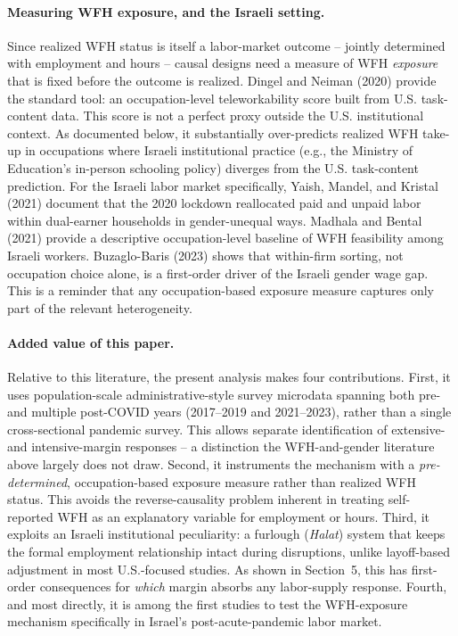 \documentclass[11pt]{article}
\begin{document}
\paragraph{Measuring WFH exposure, and the Israeli setting.} Since realized WFH status is itself a labor-market outcome -- jointly determined with employment and hours -- causal designs need a measure of WFH \emph{exposure} that is fixed before the outcome is realized. Dingel and Neiman (2020) provide the standard tool: an occupation-level teleworkability score built from U.S. task-content data. This score is not a perfect proxy outside the U.S. institutional context. As documented below, it substantially over-predicts realized WFH take-up in occupations where Israeli institutional practice (e.g., the Ministry of Education's in-person schooling policy) diverges from the U.S. task-content prediction. For the Israeli labor market specifically, Yaish, Mandel, and Kristal (2021) document that the 2020 lockdown reallocated paid and unpaid labor within dual-earner households in gender-unequal ways. Madhala and Bental (2021) provide a descriptive occupation-level baseline of WFH feasibility among Israeli workers. Buzaglo-Baris (2023) shows that within-firm sorting, not occupation choice alone, is a first-order driver of the Israeli gender wage gap. This is a reminder that any occupation-based exposure measure captures only part of the relevant heterogeneity.

\paragraph{Added value of this paper.} Relative to this literature, the present analysis makes four contributions. First, it uses population-scale administrative-style survey microdata spanning both pre- and multiple post-COVID years (2017--2019 and 2021--2023), rather than a single cross-sectional pandemic survey. This allows separate identification of extensive- and intensive-margin responses -- a distinction the WFH-and-gender literature above largely does not draw. Second, it instruments the mechanism with a \emph{pre-determined}, occupation-based exposure measure rather than realized WFH status. This avoids the reverse-causality problem inherent in treating self-reported WFH as an explanatory variable for employment or hours. Third, it exploits an Israeli institutional peculiarity: a furlough (\textit{Halat}) system that keeps the formal employment relationship intact during disruptions, unlike layoff-based adjustment in most U.S.-focused studies. As shown in Section~5, this has first-order consequences for \emph{which} margin absorbs any labor-supply response. Fourth, and most directly, it is among the first studies to test the WFH-exposure mechanism specifically in Israel's post-acute-pandemic labor market.
\end{document}
